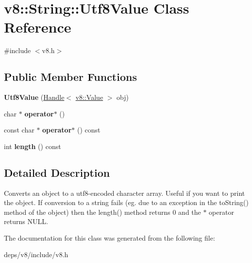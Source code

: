 \hypertarget{classv8_1_1_string_1_1_utf8_value}{}\section{v8\+:\+:String\+:\+:Utf8\+Value Class Reference}
\label{classv8_1_1_string_1_1_utf8_value}


{\ttfamily \#include $<$v8.\+h$>$}

\subsection*{Public Member Functions}
\begin{DoxyCompactItemize}
\item 
\hypertarget{classv8_1_1_string_1_1_utf8_value_aded9fd7ed406e79d5bc40eca15b6b3d7}{}{\bfseries Utf8\+Value} (\hyperlink{classv8_1_1_handle}{Handle}$<$ \hyperlink{classv8_1_1_value}{v8\+::\+Value} $>$ obj)\label{classv8_1_1_string_1_1_utf8_value_aded9fd7ed406e79d5bc40eca15b6b3d7}

\item 
\hypertarget{classv8_1_1_string_1_1_utf8_value_a6cb4914bc426bbe60b0dfdff32213e59}{}char $\ast$ {\bfseries operator$\ast$} ()\label{classv8_1_1_string_1_1_utf8_value_a6cb4914bc426bbe60b0dfdff32213e59}

\item 
\hypertarget{classv8_1_1_string_1_1_utf8_value_a6557ad0916c472faebd8bfdc3da5c4f7}{}const char $\ast$ {\bfseries operator$\ast$} () const \label{classv8_1_1_string_1_1_utf8_value_a6557ad0916c472faebd8bfdc3da5c4f7}

\item 
\hypertarget{classv8_1_1_string_1_1_utf8_value_a1e2572abf6adc0786769482df9906f19}{}int {\bfseries length} () const \label{classv8_1_1_string_1_1_utf8_value_a1e2572abf6adc0786769482df9906f19}

\end{DoxyCompactItemize}


\subsection{Detailed Description}
Converts an object to a utf8-\/encoded character array. Useful if you want to print the object. If conversion to a string fails (eg. due to an exception in the to\+String() method of the object) then the length() method returns 0 and the $\ast$ operator returns N\+U\+L\+L. 

The documentation for this class was generated from the following file\+:\begin{DoxyCompactItemize}
\item 
deps/v8/include/v8.\+h\end{DoxyCompactItemize}
